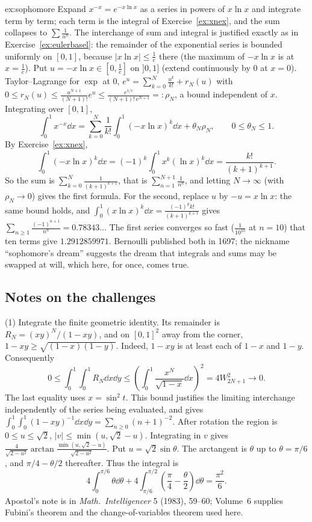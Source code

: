 \begin{solution}{ex:sophomore}
\idea Expand $x^{-x}=e^{-x\ln x}$ as a series in powers of $x\ln x$ and integrate term by term; each term is the integral of Exercise~\ref{ex:xnex}, and the sum collapses to $\sum\frac1{n^n}$. The interchange of sum and integral is justified exactly as in Exercise~\ref{ex:eulerbasel}: the remainder of the exponential series is bounded uniformly on $[0,1]$, because $|x\ln x|\le\frac1e$ there (the maximum of $-x\ln x$ is at $x=\frac1e$).
\writeup Put $u=-x\ln x\in\left[0,\frac1e\right]$ on $]0,1]$ (extend continuously by $0$ at $x=0$). Taylor--Lagrange for $\exp$ at $0$, $e^u=\sum_{k=0}^N\frac{u^k}{k!}+r_N(u)$ with $0\le r_N(u)\le\frac{u^{N+1}}{(N+1)!}e^{u}\le\frac{e^{1/e}}{(N+1)!\,e^{N+1}}=:\rho_N$, a bound independent of $x$. Integrating over $[0,1]$,
\[
\int_0^1x^{-x}\dd x=\sum_{k=0}^N\frac1{k!}\int_0^1(-x\ln x)^k\dd x+\theta_N\rho_N,\qquad0\le\theta_N\le1.
\]
By Exercise~\ref{ex:xnex},
\[
\int_0^1(-x\ln x)^k\dd x=(-1)^k\int_0^1x^k(\ln x)^k\dd x=\frac{k!}{(k+1)^{k+1}}.
\]
So the sum is $\sum_{k=0}^N\frac1{(k+1)^{k+1}}$, that is $\sum_{n=1}^{N+1}\frac1{n^n}$, and letting $N\to\infty$ (with $\rho_N\to0$) gives the first formula. For the second, replace $u$ by $-u=x\ln x$: the same bound holds, and $\int_0^1(x\ln x)^k\dd x=\frac{(-1)^kk!}{(k+1)^{k+1}}$ gives $\sum_{n\ge1}\frac{(-1)^{n+1}}{n^n}=0.78343\ldots$ The first series converges so fast ($\frac1{10^{10}}$ at $n=10$) that ten terms give $1.2912859971$. Bernoulli published both in 1697; the nickname ``sophomore's dream'' suggests the dream that integrals and sums may be swapped at will, which here, for once, comes true.
\end{solution}

\subsection*{Notes on the challenges}

(1) Integrate the finite geometric identity. Its remainder is $R_N=(xy)^N/(1-xy)$, and on $[0,1]^2$ away from the corner,
$1-xy\ge\sqrt{(1-x)(1-y)}$. Indeed, $1-xy$ is at least each of $1-x$ and $1-y$.
Consequently
\[
0\le\int_0^1\!\!\int_0^1 R_N\dd x\dd y
\le\left(\int_0^1\frac{x^N}{\sqrt{1-x}}\dd x\right)^2
=4W_{2N+1}^2\longrightarrow0.
\]
The last equality uses $x=\sin^2t$. This bound justifies the limiting interchange independently of the series being evaluated, and gives
$\int_0^1\!\!\int_0^1(1-xy)^{-1}\dd x\dd y=\sum_{n\ge0}(n+1)^{-2}$.
After rotation the region is $0\le u\le\sqrt2$, $|v|\le\min(u,\sqrt2-u)$. Integrating in $v$ gives
$\frac4{\sqrt{2-u^2}}\arctan\frac{\min(u,\sqrt2-u)}{\sqrt{2-u^2}}$.
Put $u=\sqrt2\sin\theta$. The arctangent is $\theta$ up to $\theta=\pi/6$, and $\pi/4-\theta/2$ thereafter. Thus the integral is
\[
4\int_0^{\pi/6}\theta\dd\theta+
4\int_{\pi/6}^{\pi/2}\left(\frac\pi4-\frac\theta2\right)\dd\theta=\frac{\pi^2}6.
\]
Apostol's note is in \emph{Math.\ Intelligencer} 5 (1983), 59--60; Volume~6 supplies Fubini's theorem and the change-of-variables theorem used here.

